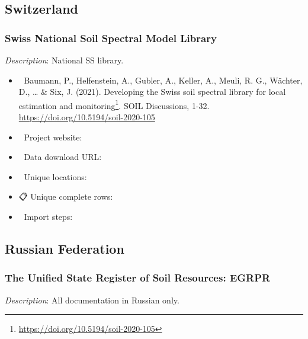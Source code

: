 \documentclass[
  graybox,natbib,nospthms]{svmono}
\providecommand{\tightlist}{%
  \setlength{\itemsep}{0pt}\setlength{\parskip}{0pt}}
\providecommand{\tightlist}{\setlength{\itemsep}{0pt}\setlength{\parskip}{0pt}}
\renewcommand{\href}[2]{#2 (\url{#1})}
\renewcommand{\href}[2]{#2\footnote{\url{#1}}}
\begin{document}
\hypertarget{switzerland}{%
\subsection{Switzerland}\label{switzerland}}

\hypertarget{swiss-national-soil-spectral-model-library}{%
\subsubsection{Swiss National Soil Spectral Model Library}\label{swiss-national-soil-spectral-model-library}}

\emph{Description}: National SS library.

\begin{itemize}
\tightlist
\item
  📕 Baumann, P., Helfenstein, A., Gubler, A., Keller, A., Meuli, R. G., Wächter, D., \ldots{} \& Six, J. (2021). \href{https://doi.org/10.5194/soil-2020-105}{Developing the Swiss soil spectral library for local estimation and monitoring}. SOIL Discussions, 1-32. \url{https://doi.org/10.5194/soil-2020-105}\\
\item
  🔗 Project website:\\
\item
  📂 Data download URL:\\
\item
  📍 Unique locations:\\
\item
  📋 Unique complete rows:\\
\item
  📝 Import steps:
\end{itemize}

\hypertarget{russian-federation}{%
\subsection{Russian Federation}\label{russian-federation}}

\hypertarget{the-unified-state-register-of-soil-resources-egrpr}{%
\subsubsection{The Unified State Register of Soil Resources: EGRPR}\label{the-unified-state-register-of-soil-resources-egrpr}}

\emph{Description}: All documentation in Russian only.
\end{document}
